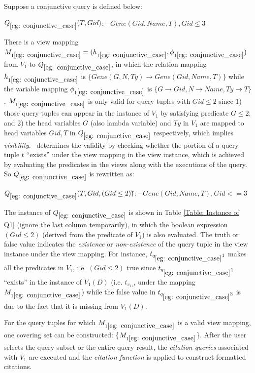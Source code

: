 \begin{example}\label{eg: conjunctive_case}
Suppose a conjunctive query is defined below:
\begin{tabbing}
$Q_{\ref{eg: conjunctive_case}}(T, Gid) $\hspace{0.05em}$:- Gene(Gid, Name, T), Gid \leq 3$
\end{tabbing}
There is a view mapping $M_{1\ref{eg: conjunctive_case}} = (h_{1\ref{eg: conjunctive_case}}, \phi_{1\ref{eg: conjunctive_case}})$ from $V_1$ to $Q_{\ref{eg: conjunctive_case}}$, in which the relation mapping $h_{1\ref{eg: conjunctive_case}}$ is $\{Gene(G, N, Ty) \rightarrow Gene(Gid, Name, T)\}$ while the variable mapping $\phi_{1\ref{eg: conjunctive_case}}$ is $\{G\rightarrow Gid, N \rightarrow Name, Ty\rightarrow T\}$. $M_{1\ref{eg: conjunctive_case}}$ is only valid for query tuples with $Gid \leq 2$ since 1) those query tuples can appear in the instance of $V_1$ by satisfying predicate $G \leq 2$; and 2) the head variables $G$ (also lambda variable) and $Ty$ in $V_1$ are mapped to head variables $Gid, T$ in $Q_{\ref{eg: conjunctive_case}}$ respectively, which implies {\em visibility}. \rba\ determines the validity by checking whether the portion of a query tuple $t$ ``exists'' under the view mapping in the view instance, which is achieved by evaluating the predicates in the views along with the executions of the query. So $Q_{\ref{eg: conjunctive_case}}$ is rewritten as:


\begin{tabbing}
$Q_{\ref{eg: conjunctive_case}}(T, Gid,(Gid \leq 2))$\hspace{0.1em}\=$:-Gene(Gid, Name, T),Gid <= 3$
\end{tabbing}

The instance of $Q_{\ref{eg: conjunctive_case}}$ is shown in Table \ref{Table: Instance of Q1} (ignore the last column temporarily), in which the boolean expression $(Gid \leq 2)$ (derived from the predicate of $V_1$) is also evaluated. The truth or false value indicates the {\em existence} or {\em non-existence} of the query tuple in the view instance under the view mapping. For instance, $t_{q_{\ref{eg: conjunctive_case}}1}$ makes all the predicates in $V_1$, i.e. $(Gid \leq 2)$ true since $t_{q_{\ref{eg: conjunctive_case}}1}$ ``exists'' in the instance of $V_1(D)$ (i.e. $t_{v_11}$, under the mapping $M_{1\ref{eg: conjunctive_case}}$) while the false value in $t_{q_{\ref{eg: conjunctive_case}}3}$ is due to the fact that it is missing from $V_1(D)$.

For the query tuples for which $M_{1\ref{eg: conjunctive_case}}$ is a valid view mapping, one covering set can be constructed:  \{$M_{1\ref{eg: conjunctive_case}}$\}. After the user selects the query subset or the entire query result,  the \textit{citation queries} associated with $V_1$ are executed and the {\em citation function} is applied to construct formatted citations.
\end{example}
